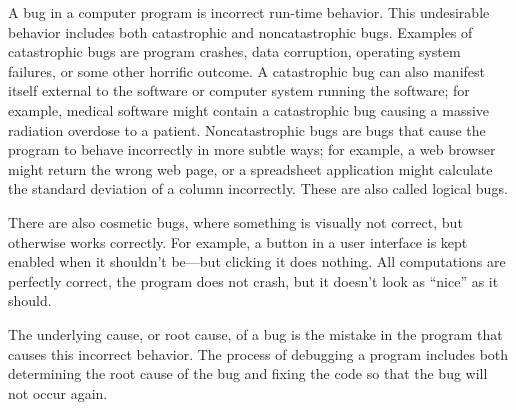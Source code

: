 A bug in a computer program is incorrect run-time behavior. This undesirable behavior includes both catastrophic and noncatastrophic bugs. Examples of catastrophic bugs are program crashes, data corruption, operating system failures, or some other horrific outcome. A catastrophic bug can also manifest itself external to the software or computer system running the software; for example, medical software might contain a catastrophic bug causing a massive radiation overdose to a patient. Noncatastrophic bugs are bugs that cause the program to behave incorrectly in more subtle ways; for example, a web browser might return the wrong web page, or a spreadsheet application might calculate the standard deviation of a column incorrectly. These are also called logical bugs.

There are also cosmetic bugs, where something is visually not correct, but otherwise works correctly. For example, a button in a user interface is kept enabled when it shouldn’t be—but clicking it does nothing. All computations are perfectly correct, the program does not crash, but it doesn’t look as “nice” as it should.

The underlying cause, or root cause, of a bug is the mistake in the program that causes this incorrect behavior. The process of debugging a program includes both determining the root cause of the bug and fixing the code so that the bug will not occur again.












